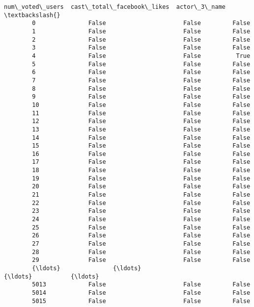 \documentclass[11pt]{article}
\begin{document}
\begin{Verbatim}[commandchars=\\\{\}]
              num\_voted\_users  cast\_total\_facebook\_likes  actor\_3\_name  \textbackslash{}
        0               False                      False         False   
        1               False                      False         False   
        2               False                      False         False   
        3               False                      False         False   
        4               False                      False          True   
        5               False                      False         False   
        6               False                      False         False   
        7               False                      False         False   
        8               False                      False         False   
        9               False                      False         False   
        10              False                      False         False   
        11              False                      False         False   
        12              False                      False         False   
        13              False                      False         False   
        14              False                      False         False   
        15              False                      False         False   
        16              False                      False         False   
        17              False                      False         False   
        18              False                      False         False   
        19              False                      False         False   
        20              False                      False         False   
        21              False                      False         False   
        22              False                      False         False   
        23              False                      False         False   
        24              False                      False         False   
        25              False                      False         False   
        26              False                      False         False   
        27              False                      False         False   
        28              False                      False         False   
        29              False                      False         False   
        {\ldots}               {\ldots}                        {\ldots}           {\ldots}   
        5013            False                      False         False   
        5014            False                      False         False   
        5015            False                      False         False   

\end{Verbatim}
\end{document}
